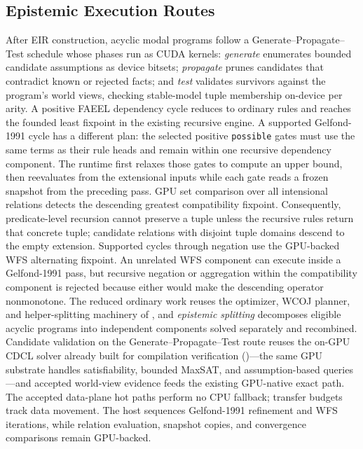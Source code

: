 \subsection{Epistemic Execution Routes}\label{subsec:epistemic-gpu}

After EIR construction, acyclic modal programs follow a Generate--Propagate--Test schedule whose phases run as CUDA kernels: \emph{generate} enumerates bounded candidate assumptions as device bitsets; \emph{propagate} prunes candidates that contradict known or rejected facts; and \emph{test} validates survivors against the program's world views, checking stable-model tuple membership on-device per arity. A positive FAEEL dependency cycle reduces to ordinary rules and reaches the founded least fixpoint in the existing recursive engine. A supported Gelfond-1991 cycle has a different plan: the selected positive \texttt{possible} gates must use the same terms as their rule heads and remain within one recursive dependency component. The runtime first relaxes those gates to compute an upper bound, then reevaluates from the extensional inputs while each gate reads a frozen snapshot from the preceding pass. GPU set comparison over all intensional relations detects the descending greatest compatibility fixpoint. Consequently, predicate-level recursion cannot preserve a tuple unless the recursive rules return that concrete tuple; candidate relations with disjoint tuple domains descend to the empty extension. Supported cycles through negation use the GPU-backed WFS alternating fixpoint. An unrelated WFS component can execute inside a Gelfond-1991 pass, but recursive negation or aggregation within the compatibility component is rejected because either would make the descending operator nonmonotone. The reduced ordinary work reuses the optimizer, WCOJ planner, and helper-splitting machinery of , and \emph{epistemic splitting} decomposes eligible acyclic programs into independent components solved separately and recombined. Candidate validation on the Generate--Propagate--Test route reuses the on-GPU CDCL solver already built for compilation verification ()---the same GPU substrate handles satisfiability, bounded MaxSAT, and assumption-based queries---and accepted world-view evidence feeds the existing GPU-native exact path. The accepted data-plane hot paths perform no CPU fallback; transfer budgets track data movement. The host sequences Gelfond-1991 refinement and WFS iterations, while relation evaluation, snapshot copies, and convergence comparisons remain GPU-backed.

